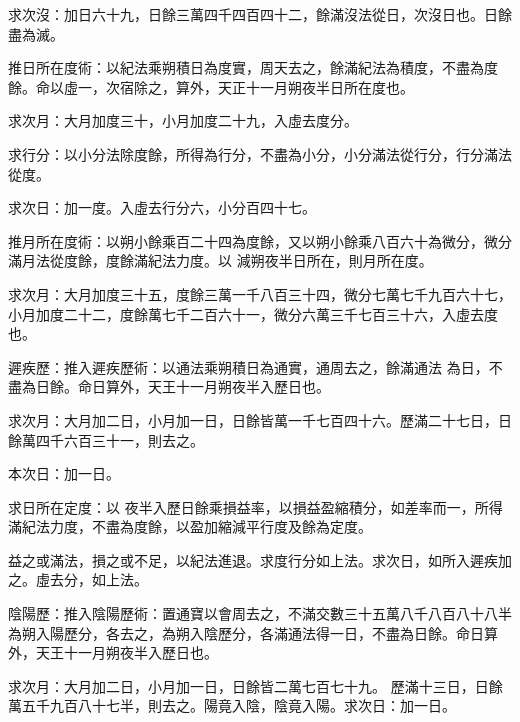 \begin{pinyinscope}
 求次沒：加日六十九，日餘三萬四千四百四十二，餘滿沒法從日，次沒日也。日餘盡為滅。



 推日所在度術：以紀法乘朔積日為度實，周天去之，餘滿紀法為積度，不盡為度餘。命以虛一，次宿除之，算外，天正十一月朔夜半日所在度也。



 求次月：大月加度三十，小月加度二十九，入虛去度分。



 求行分：以小分法除度餘，所得為行分，不盡為小分，小分滿法從行分，行分滿法從度。



 求次日：加一度。入虛去行分六，小分百四十七。



 推月所在度術：以朔小餘乘百二十四為度餘，又以朔小餘乘八百六十為微分，微分滿月法從度餘，度餘滿紀法力度。以
 減朔夜半日所在，則月所在度。



 求次月：大月加度三十五，度餘三萬一千八百三十四，微分七萬七千九百六十七，小月加度二十二，度餘萬七千二百六十一，微分六萬三千七百三十六，入虛去度也。



 遲疾歷：推入遲疾歷術：以通法乘朔積日為通實，通周去之，餘滿通法
 為日，不盡為日餘。命日算外，天王十一月朔夜半入歷日也。



 求次月：大月加二日，小月加一日，日餘皆萬一千七百四十六。歷滿二十七日，日餘萬四千六百三十一，則去之。



 本次日：加一日。



 求日所在定度：以
 夜半入歷日餘乘損益率，以損益盈縮積分，如差率而一，所得滿紀法力度，不盡為度餘，以盈加縮減平行度及餘為定度。



 益之或滿法，損之或不足，以紀法進退。求度行分如上法。求次日，如所入遲疾加之。虛去分，如上法。



 陰陽歷：推入陰陽歷術：置通寶以會周去之，不滿交數三十五萬八千八百八十八半為朔入陽歷分，各去之，為朔入陰歷分，各滿通法得一日，不盡為日餘。命日算外，天王十一月朔夜半入歷日也。



 求次月：大月加二日，小月加一日，日餘皆二萬七百七十九。
 歷滿十三日，日餘萬五千九百八十七半，則去之。陽竟入陰，陰竟入陽。求次日：加一日。




\end{pinyinscope}
